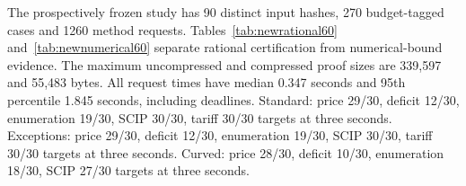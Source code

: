 The prospectively frozen study has 90 distinct input hashes, 270 budget-tagged cases and 1260 method requests. Tables~\ref{tab:newrational60} and~\ref{tab:newnumerical60} separate rational certification from numerical-bound evidence. The maximum uncompressed and compressed proof sizes are 339,597 and 55,483 bytes. All request times have median 0.347 seconds and 95th percentile 1.845 seconds, including deadlines. Standard: price 29/30, deficit 12/30, enumeration 19/30, SCIP 30/30, tariff 30/30 targets at three seconds. Exceptions: price 29/30, deficit 12/30, enumeration 19/30, SCIP 30/30, tariff 30/30 targets at three seconds. Curved: price 28/30, deficit 10/30, enumeration 18/30, SCIP 27/30 targets at three seconds. 
